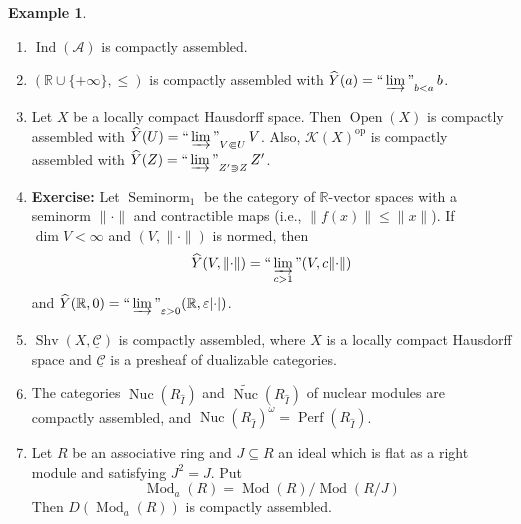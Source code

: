 \documentclass[draft]{amsart}
\newcommand{\RR}{\mathbb{R}}
\newcommand{\ul}[1]{\underline{#1}}
\newcommand{\wh}[1]{\widehat{#1}}
\newcommand{\wt}[1]{\widetilde{#1}}
\newcommand{\cat}[1]{\mathcal{#1}}
\newcommand{\op}{\mathrm{op}}
\DeclareMathOperator{\Ind}{Ind}
\DeclareMathOperator{\Open}{Open}
\DeclareMathOperator{\Seminorm}{Seminorm}
\DeclareMathOperator{\Shv}{Shv}
\DeclareMathOperator{\Nuc}{Nuc}
\DeclareMathOperator{\Mod}{Mod}
\DeclareMathOperator{\Perf}{Perf}
\DeclareMathOperator*{\indinjlim}{\text{``}\varinjlim\text{''}} %
\theoremstyle{definition}
\newtheorem{ex}[thm]{Example}
\begin{document}
\begin{ex}
\begin{enumerate}[(1)]
\item $\Ind(\cat A)$ is compactly assembled.
\item $(\RR\cup \{+\infty\}, \le)$ is compactly assembled with $\wh{Y}(a) = \indinjlim_{b<a}b$.

\item Let $X$ be a locally compact Hausdorff space. Then $\Open(X)$ is compactly assembled with $\wh{Y}(U) = \indinjlim_{V\Subset U} V$. Also, $\cat K(X)^{\op}$ is compactly assembled with $\wh{Y}(Z) = \indinjlim_{Z'\Supset Z} Z'$.

\item \textbf{Exercise:} Let $\Seminorm_1$ be the category of $\RR$-vector spaces with a seminorm $\lVert\cdot\rVert$ and contractible maps (i.e., $\lVert f(x)\rVert \le \lVert x\rVert$). If $\dim V < \infty$ and $(V,\lVert\cdot\rVert)$ is normed, then
\[
\wh{Y}(V,\lVert\cdot\rVert) = \indinjlim_{c>1} (V, c \lVert\cdot\rVert)
\]
and $\wh{Y}(\RR, 0) = \indinjlim_{\varepsilon>0} (\RR,\varepsilon \lvert\cdot\rvert)$.

\item $\Shv(X,\ul{\cat C})$ is compactly assembled, where $X$ is a locally compact Hausdorff space and $\ul{\cat C}$ is a presheaf of dualizable categories.

\item The categories $\Nuc(R_{\wh{I}})$ and $\wt{\Nuc}(R_{\wh{I}})$ of nuclear modules are compactly assembled, and $\Nuc(R_{\wh{I}})^{\omega} = \Perf(R_{\wh{I}})$.

\item Let $R$ be an associative ring and $J\subseteq R$ an ideal which is flat as a right module and satisfying $J^2 = J$. Put
\[
\Mod_a(R) = \Mod(R)/\Mod(R/J)
\]
Then $D(\Mod_a(R))$ is compactly assembled.
\end{enumerate}
\end{ex}
\end{document}
